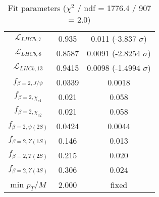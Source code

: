 \begin{table}[h!]
\begin{tabular}{c|c|c}
$\mathcal L_{LHCb,7}$ & 0.935 & 0.011 (-3.837 $\sigma$) \\
$\mathcal L_{LHCb,8}$ & 0.8587 & 0.0091 (-2.8254 $\sigma$) \\
$\mathcal L_{LHCb,13}$ & 0.9415 & 0.0098 (-1.4994 $\sigma$) \\
$f_{\beta=2,J/\psi}$ & 0.0339 & 0.0018 \\
$f_{\beta=2,\chi_{c1}}$ & 0.021 & 0.058 \\
$f_{\beta=2,\chi_{c2}}$ & 0.021 & 0.058 \\
$f_{\beta=2,\psi(2S)}$ & 0.0424 & 0.0044 \\
$f_{\beta=2,\Upsilon(1S)}$ & 0.146 & 0.013 \\
$f_{\beta=2,\Upsilon(2S)}$ & 0.215 & 0.020 \\
$f_{\beta=2,\Upsilon(3S)}$ & 0.306 & 0.024 \\
min $p_T/M$ & 2.000 & fixed \\
\end{tabular}
\caption{Fit parameters ($\chi^2$ / ndf = 1776.4 / 907 = 2.0)}
\end{table}
